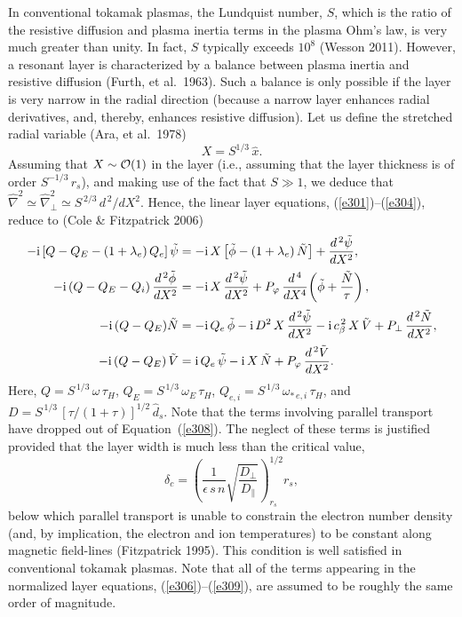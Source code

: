 \documentclass[notitlepage,12pt]{article}
\begin{document}
In conventional tokamak plasmas, the Lundquist number, $S$, which is the ratio of the resistive diffusion and plasma inertia terms in the plasma Ohm's law, is very much greater than unity. In fact, $S$ typically exceeds $10^8$ (Wesson 2011). However, a resonant layer is
characterized by a balance between plasma inertia and resistive diffusion (Furth, et al.\ 1963). Such a balance is
only possible if the layer is very narrow in the radial direction (because a narrow layer enhances radial derivatives, and, thereby, enhances
resistive diffusion). Let us define the stretched radial variable (Ara, et al.\ 1978)
\begin{equation}
X = S^{1/3}\,\hat{x}.
\end{equation}
Assuming that $X\sim{\cal O}(1)$ in the layer (i.e., assuming that the layer thickness is of order $S^{-1/3}\,r_s$),
and making use of the fact that $S\gg 1$, we deduce that $\hat{\nabla}^2\simeq \hat{\nabla}_\perp^2\simeq S^{\,2/3}\,d^{\,2}/dX^2$.
Hence, the linear layer equations, (\ref{e301})--(\ref{e304}), reduce to (Cole \& Fitzpatrick 2006)
\begin{align}\label{e306}
-{\rm i}\,[Q-Q_E-(1+\lambda_e)\,Q_{e}]\,\tilde{\psi}&= - {\rm i}\,X\left[\tilde{\phi}-(1+\lambda_e)\,\tilde{N}\right] + \frac{d^{\,2}\tilde{\psi}}{d X^2},\\[0.5ex]
-{\rm i}\,(Q-Q_E -Q_{i})\,\frac{d^{\,2}\tilde{\phi}}{dX^2}&= - {\rm i}\,X\,\frac{d^{\,2}\tilde{\psi}}{dX^2}+ P_\varphi\,\frac{d^{\,4}}{dX^4}\!\left(\tilde{\phi} + \frac{\tilde{N}}{\tau}\right),\\[0.5ex]
-{\rm i}\,(Q-Q_E)\tilde{N} &= - {\rm i}\,Q_{e}\,\tilde{\phi} - {\rm i} \,D^{2}\,X\,\frac{d^{\,2}\tilde{\psi}}{dX^{2}}
 - {\rm i}\,c_\beta^{\,2}\,X\,\tilde{V} + P_\perp\,\frac{d^{\,2} \tilde{N}}{dX^{2}},\label{e308}\\[0.5ex]
 -{\rm i}\,(Q-Q_E)\,\tilde{V} &= {\rm i}\,Q_{e}\,\tilde{\psi} - {\rm i}\,X\,\tilde{N} + P_\varphi\,\frac{d^{\,2}\tilde{V}}{dX^{2}}.\label{e309}
\end{align}
Here, $Q=S^{\,1/3}\,\omega\,\tau_H$, $Q_E = S^{\,1/3}\,\omega_E\,\tau_H$, $Q_{e,i} = S^{\,1/3}\,\omega_{\ast\,e,i}\,\tau_H$,
and $D = S^{\,1/3}\,[\tau/(1+\tau)]^{1/2}\,\hat{d}_s$. Note that the terms involving parallel transport have dropped out of
Equation~(\ref{e308}). The neglect of these terms is justified provided that the layer width is much less than the critical value,
\begin{equation}
\delta_c = \left(\frac{1}{\epsilon\,s\,n}\sqrt{\frac{D_\perp}{D_\parallel}}\right)^{1/2}_{r_s} r_s,
\end{equation}
below which parallel transport is unable to constrain the electron number density (and, by implication, the electron and
ion temperatures) to be constant along magnetic field-lines (Fitzpatrick 1995). This condition is well satisfied in conventional
tokamak plasmas. 
Note that all of the terms appearing in the 
normalized layer equations, (\ref{e306})--(\ref{e309}), are assumed to be roughly the same order of magnitude. 
\end{document}
